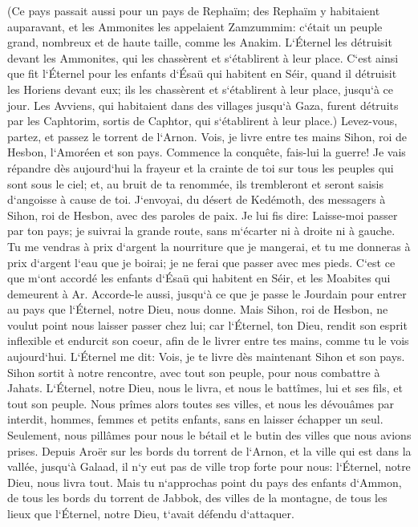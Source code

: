 \verse (Ce pays passait aussi pour un pays de Rephaïm; des Rephaïm y habitaient auparavant, et les Ammonites les appelaient Zamzummim: 
\verse c`était un peuple grand, nombreux et de haute taille, comme les Anakim. L`Éternel les détruisit devant les Ammonites, qui les chassèrent et s`établirent à leur place. 
\verse C`est ainsi que fit l`Éternel pour les enfants d`Ésaü qui habitent en Séir, quand il détruisit les Horiens devant eux; ils les chassèrent et s`établirent à leur place, jusqu`à ce jour. 
\verse Les Avviens, qui habitaient dans des villages jusqu`à Gaza, furent détruits par les Caphtorim, sortis de Caphtor, qui s`établirent à leur place.) 
\verse Levez-vous, partez, et passez le torrent de l`Arnon. Vois, je livre entre tes mains Sihon, roi de Hesbon, l`Amoréen et son pays. Commence la conquête, fais-lui la guerre! 
\verse Je vais répandre dès aujourd`hui la frayeur et la crainte de toi sur tous les peuples qui sont sous le ciel; et, au bruit de ta renommée, ils trembleront et seront saisis d`angoisse à cause de toi. 
\verse J`envoyai, du désert de Kedémoth, des messagers à Sihon, roi de Hesbon, avec des paroles de paix. Je lui fis dire: 
\verse Laisse-moi passer par ton pays; je suivrai la grande route, sans m`écarter ni à droite ni à gauche. 
\verse Tu me vendras à prix d`argent la nourriture que je mangerai, et tu me donneras à prix d`argent l`eau que je boirai; je ne ferai que passer avec mes pieds. 
\verse C`est ce que m`ont accordé les enfants d`Ésaü qui habitent en Séir, et les Moabites qui demeurent à Ar. Accorde-le aussi, jusqu`à ce que je passe le Jourdain pour entrer au pays que l`Éternel, notre Dieu, nous donne. 
\verse Mais Sihon, roi de Hesbon, ne voulut point nous laisser passer chez lui; car l`Éternel, ton Dieu, rendit son esprit inflexible et endurcit son coeur, afin de le livrer entre tes mains, comme tu le vois aujourd`hui. 
\verse L`Éternel me dit: Vois, je te livre dès maintenant Sihon et son pays. 
\verse Sihon sortit à notre rencontre, avec tout son peuple, pour nous combattre à Jahats. 
\verse L`Éternel, notre Dieu, nous le livra, et nous le battîmes, lui et ses fils, et tout son peuple. 
\verse Nous prîmes alors toutes ses villes, et nous les dévouâmes par interdit, hommes, femmes et petits enfants, sans en laisser échapper un seul. 
\verse Seulement, nous pillâmes pour nous le bétail et le butin des villes que nous avions prises. 
\verse Depuis Aroër sur les bords du torrent de l`Arnon, et la ville qui est dans la vallée, jusqu`à Galaad, il n`y eut pas de ville trop forte pour nous: l`Éternel, notre Dieu, nous livra tout. 
\verse Mais tu n`approchas point du pays des enfants d`Ammon, de tous les bords du torrent de Jabbok, des villes de la montagne, de tous les lieux que l`Éternel, notre Dieu, t`avait défendu d`attaquer. 

